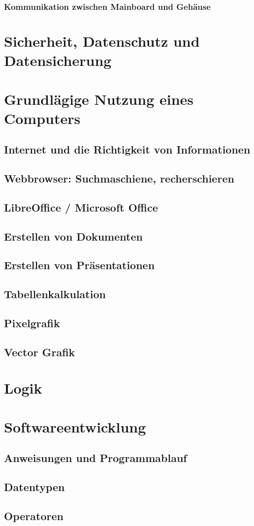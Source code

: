 \documentclass[12pt]{article}
\begin{document}
\subsubsection{Kommunikation zwischen Mainboard und Gehäuse}

\section{Sicherheit, Datenschutz und Datensicherung}

\section{Grundlägige Nutzung eines Computers}
\subsection{Internet und die Richtigkeit von Informationen }
\subsection{Webbrowser: Suchmaschiene, recherschieren}
\subsection{LibreOffice / Microsoft Office}
\subsection{Erstellen von Dokumenten}
\subsection{Erstellen von Präsentationen}
\subsection{Tabellenkalkulation}
\subsection{Pixelgrafik}
\subsection{Vector Grafik}

\section{Logik}

\section{Softwareentwicklung}
\subsection{Anweisungen und Programmablauf}
\subsection{Datentypen}
\subsection{Operatoren}


\begin{align}
\end{align}
\end{document}
